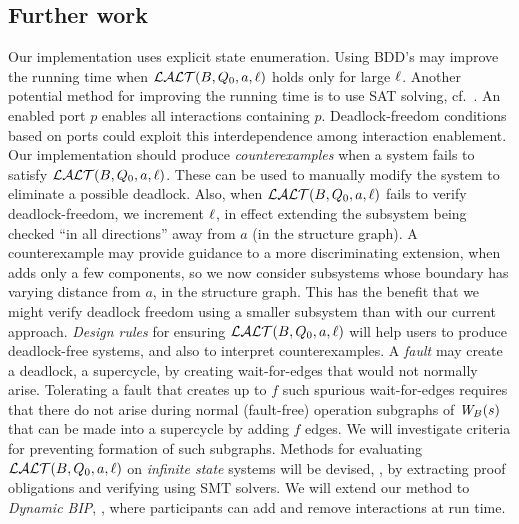 \subsection{Further work} 
Our implementation uses explicit state enumeration. %
Using BDD's may improve the running time 
when $\mathcal{LALT}(B, Q_0, a, \ell)$ holds only for large $\ell$.
Another potential method for improving the running time is to use 
SAT solving, cf.\ .
%
%
An enabled port $p$ enables all interactions containing $p$.
Deadlock-freedom conditions based on ports could exploit
this interdependence among interaction enablement.
%
Our implementation should produce \emph{counterexamples} when a system fails to satisfy $\mathcal{LALT}(B, Q_0, a, \ell)$. These can be used to manually modify the system
to eliminate a possible deadlock.  Also, when $\mathcal{LALT}(B, Q_0, a, \ell)$ fails to verify deadlock-freedom, we increment $\ell$, in effect extending the
subsystem being checked ``in all directions'' away from $a$ (in the structure graph). A counterexample may provide guidance to a more discriminating
extension, when adds only a few components, so we now consider subsystems whose boundary has varying distance from $a$, in the structure graph. This
has the benefit that we might verify deadlock freedom using a smaller subsystem than with our current approach.
%
\emph{Design rules} for ensuring $\mathcal{LALT}(B, Q_0, a, \ell)$ will help users to
produce deadlock-free systems, and also to interpret counterexamples.
%
A \emph{fault} may create a deadlock,  \ie a supercycle, by creating 
wait-for-edges that would not normally arise.
Tolerating a fault that creates up to $f$ such spurious wait-for-edges 
requires that there do not arise during normal
(fault-free) operation subgraphs of $\mathit{W}_{B}({s})$ that can be made into a
supercycle by adding $f$ edges. 
We will investigate criteria for preventing formation of such subgraphs.
%
Methods for evaluating $\mathcal{LALT}(B, Q_0, a, \ell)$ on \emph{infinite state} systems will be
devised, \eg, by extracting proof obligations and verifying using SMT solvers.
%
We will extend our method to \emph{Dynamic BIP},
\cite{DBLP:conf/soco/BozgaJMS12}, where participants can add and remove
interactions at run time.


